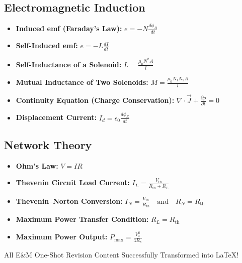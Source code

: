 \documentclass[11pt,a4paper]{article}
\begin{document}
\subsection{Electromagnetic Induction}
\begin{itemize}
    \item \textbf{Induced emf (Faraday's Law):} $e = -N\frac{d\phi_B}{dt}$
    \item \textbf{Self-Induced emf:} $e = -L\frac{dI}{dt}$
    \item \textbf{Self-Inductance of a Solenoid:} $L = \frac{\mu_0N^2A}{l}$
    \item \textbf{Mutual Inductance of Two Solenoids:} $M = \frac{\mu_0N_1N_2A}{l}$
    \item \textbf{Continuity Equation (Charge Conservation):} $\nabla\cdot\vec{J} + \frac{\partial\rho}{\partial t} = 0$
    \item \textbf{Displacement Current:} $I_d = \epsilon_0\frac{d\phi_E}{dt}$
\end{itemize}

\subsection{Network Theory}
\begin{itemize}
    \item \textbf{Ohm's Law:} $V = IR$
    \item \textbf{Thevenin Circuit Load Current:} $I_L = \frac{V_{\text{th}}}{R_{\text{th}}+R_L}$
    \item \textbf{Thevenin--Norton Conversion:} $I_N = \frac{V_{\text{th}}}{R_{\text{th}}} \quad \text{and} \quad R_N = R_{\text{th}}$
    \item \textbf{Maximum Power Transfer Condition:} $R_L = R_{\text{th}}$
    \item \textbf{Maximum Power Output:} $P_{\text{max}} = \frac{V_s^2}{4R_s}$
\end{itemize}

\begin{successbox}
    All E\&M One-Shot Revision Content Successfully Transformed into LaTeX! \checkmark
\end{successbox}
\end{document}

